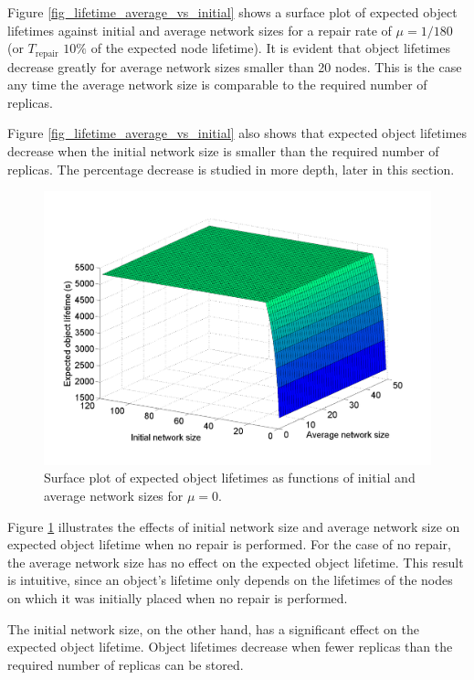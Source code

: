 \documentclass[10pt,a4paper,conference]{IEEEtran}
\begin{document}
Figure \ref{fig_lifetime_average_vs_initial} shows a surface plot of expected object lifetimes against initial and average network sizes for a repair rate of $\mu = 1/180$ (or $T_{\textrm{repair}}$ $10\%$ of the expected node lifetime). It is evident that object lifetimes decrease greatly for average network sizes smaller than 20 nodes. This is the case any time the average network size is comparable to the required number of replicas.

Figure \ref{fig_lifetime_average_vs_initial} also shows that expected object lifetimes decrease when the initial network size is smaller than the required number of replicas. The percentage decrease is studied in more depth, later in this section.

\begin{figure}[htbp]
 \centering
 \includegraphics[clip=true, viewport=2.5cm 1.0cm 27.5cm 19.15cm, width=\columnwidth]{lifetime_av_init_groupsize_norep}
 \caption{Surface plot of expected object lifetimes as functions of initial and average network sizes for $\mu = 0$.}
 \label{fig_lifetime_average_vs_initial_norep}
\end{figure}

Figure \ref{fig_lifetime_average_vs_initial_norep} illustrates the effects of initial network size and average network size on expected object lifetime when no repair is performed. For the case of no repair, the average network size has no effect on the expected object lifetime. This result is intuitive, since an object's lifetime only depends on the lifetimes of the nodes on which it was initially placed when no repair is performed.

The initial network size, on the other hand, has a significant effect on the expected object lifetime. Object lifetimes decrease when fewer replicas than the required number of replicas can be stored.
\end{document}
